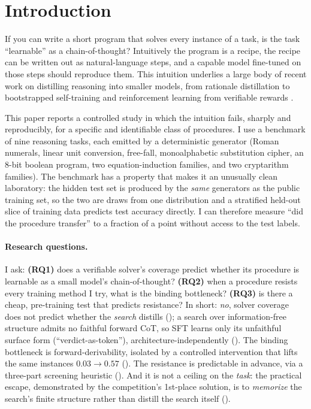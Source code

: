 \documentclass[11pt]{article}
\begin{document}
\section{Introduction}
\label{sec:intro}

If you can write a short program that solves every instance of a task, is the task
``learnable'' as a chain-of-thought? Intuitively the program is a recipe, the recipe can
be written out as natural-language steps, and a capable model fine-tuned on those steps
should reproduce them. This intuition underlies a large body of recent work on distilling
reasoning into smaller models, from rationale distillation \citep{hsieh2023distill} to
bootstrapped self-training \citep{zelikman2022star} and reinforcement learning from
verifiable rewards \citep{shao2024deepseekmath, guo2025deepseekr1, lambert2024tulu3}.

This paper reports a controlled study in which the intuition fails, sharply and
reproducibly, for a specific and identifiable class of procedures. I use a benchmark of
nine reasoning tasks, each emitted by a deterministic generator (Roman numerals, linear
unit conversion, free-fall, monoalphabetic substitution cipher, an 8-bit boolean program,
two equation-induction families, and two cryptarithm families). The benchmark has a
property that makes it an unusually clean laboratory: the hidden test set is produced by
the \emph{same} generators as the public training set, so the two are draws from one
distribution and a stratified held-out slice of training data predicts test accuracy
directly. I can therefore measure ``did the procedure transfer'' to a fraction of a
point without access to the test labels.

\paragraph{Research questions.} I ask: \textbf{(RQ1)} does a verifiable solver's coverage
predict whether its procedure is learnable as a small model's chain-of-thought?
\textbf{(RQ2)} when a procedure resists every training method I try, what is the binding
bottleneck? \textbf{(RQ3)} is there a cheap, pre-training test that predicts resistance? In
short: \emph{no}, solver coverage does not predict whether the \emph{search} distills
(); a search over information-free structure admits no faithful forward CoT, so
SFT learns only its unfaithful surface form (``verdict-as-token''), architecture-independently
(). The binding bottleneck is forward-derivability, isolated by a controlled
intervention that lifts the same instances $0.03\!\to\!0.57$ (). The resistance
is predictable in advance, via a three-part screening heuristic (). And it is
not a ceiling on the \emph{task}: the practical escape, demonstrated by the competition's
1st-place solution, is to \emph{memorize} the search's finite structure rather than distill the
search itself ().
\end{document}
